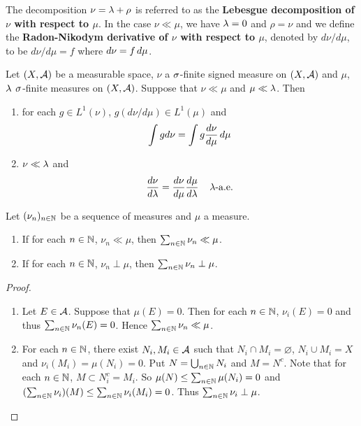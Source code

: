 \documentclass{book}
\begin{document}
	\begin{defn}  
		The decomposition $\nu = \lambda + \rho$ is referred to as the \textbf{Lebesgue decomposition of $\nu$ with respect to $\mu$}. In the case $\nu \ll \mu$, we have $\lambda = 0$ and $\rho = \nu$ and we define the \textbf{Radon-Nikodym derivative of $\nu$ with respect to $\mu$}, denoted by $d\nu/d\mu$, to be $d\nu/d\mu = f$ where $d\nu = f\, d \mu$.   
	\end{defn}
	
	\begin{thm}
		Let $(X, \mathcal{A})$ be a measurable space, $\nu$ a $\sigma$-finite signed measure on $(X, \mathcal{A})$ and $\mu$, $\lambda$ $\sigma$-finite measures on $(X,\mathcal{A})$. Suppose that $\nu \ll \mu$ and $\mu \ll \lambda$. Then 
		\begin{enumerate}
			\item for each $g \in L^1(\nu)$, $g(d\nu/d\mu) \in  L^1(\mu)$ and $$\int g d\nu = \int g \frac{d\nu}{d\mu} \, d \mu$$
			\item $\nu \ll \lambda$ and $$\frac{d \nu}{d\lambda} = \frac{d \nu}{d\mu} \frac{d\mu}{d\lambda} \hspace{4mm} \lambda \text{-a.e.}$$
		\end{enumerate}
	\end{thm}
	
	\begin{ex}  
		Let $(\nu_n)_{n \in \mathbb{N}}$ be a sequence of measures and $\mu$ a measure. 
		\begin{enumerate}
			\item If for each $n \in \mathbb{N}$, $\nu_n \ll \mu$, then $\sum_{n \in \mathbb{N}} \nu_n \ll \mu$. 
			\item If for each $n \in \mathbb{N}$, $\nu_n \perp \mu$, then $\sum_{n \in \mathbb{N}} \nu_n \perp \mu$.
		\end{enumerate} 
	\end{ex}
	
	\begin{proof}
		\begin{enumerate}
			\item Let $E \in \mathcal{A}$. Suppose that $\mu(E) = 0$. Then for each $n \in \mathbb{N}$, $\nu_i(E) = 0$ and thus $\sum_{n \in \mathbb{N}} \nu_n(E) = 0$. Hence $\sum_{n \in \mathbb{N}} \nu_n \ll \mu$.
			\item For each $n \in \mathbb{N}$, there exist $N_i, M_i \in \mathcal{A}$ such that $N_i \cap M_i = \varnothing$, $N_i \cup M_i = X$ and $\nu_i(M_i) = \mu(N_i) = 0$. Put $N = \bigcup_{n \in \mathbb{N}} N_i$ and $M = N^c$. Note that for each $n \in \mathbb{N}$, $M \subset N_i^c = M_i$. So $\mu(N) \leq \sum_{n \in \mathbb{N}} \mu(N_i) = 0$ and $(\sum_{n \in \mathbb{N}} \nu_i) (M) \leq \sum_{n \in \mathbb{N}} \nu_i(M_i) = 0$. Thus $\sum_{n \in \mathbb{N}} \nu_i \perp \mu$.
		\end{enumerate}
	\end{proof}
	
\end{document}

